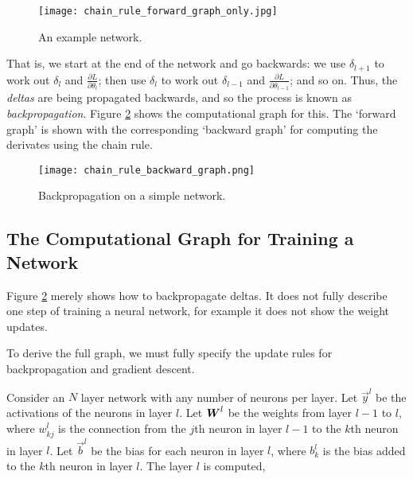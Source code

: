 \begin{figure}[t]
    \centering
    \texttt{[image: chain\_rule\_forward\_graph\_only.jpg]}
    \caption{An example network.}
    \label{fig:2-nn-chain-rule-forward}
\end{figure}

That is, we start at the end of the network and go backwards:
we use \(\delta_{l+1}\) to work out \(\delta_l\) and \(\frac{\partial L}{\partial \theta_l}\);
then use \(\delta_l\) to work out \(\delta_{l-1}\) and \(\frac{\partial L}{\partial \theta_{l-1}}\); and so on.
Thus, the \textit{deltas} are being propagated backwards, and so the process is known as \textit{backpropagation}.
Figure \ref{fig:2-nn-chain-rule-backward} shows the computational graph for this.
The `forward graph' is shown with the corresponding `backward graph' for computing the derivates using the chain rule.

\begin{figure}[htb]
    \centering
    \texttt{[image: chain\_rule\_backward\_graph.png]}
    \caption{Backpropagation on a simple network.}
    \label{fig:2-nn-chain-rule-backward}
\end{figure}


\subsection{The Computational Graph for Training a Network}

Figure \ref{fig:2-nn-chain-rule-backward} merely shows how to backpropagate deltas.
It does not fully describe one step of training a neural network, for example it does not show the weight updates.

To derive the full graph, we must fully specify the update rules for backpropagation and gradient descent.


Consider an \(N\) layer network with any number of neurons per layer.
Let \(\vec{y}^l\) be the activations of the neurons in layer \(l\).
Let \({\boldsymbol{{W}}}^l\) be the weights from layer \(l-1\) to \(l\), where \(w^l_{kj}\) is the connection from the \(j\)th neuron in layer \(l-1\) to the \(k\)th neuron in layer \(l\).
Let \(\vec{b}^l\) be the bias for each neuron in layer \(l\), where \(b^l_k\) is the bias added to the \(k\)th neuron in layer \(l\). The layer \(l\) is computed,

